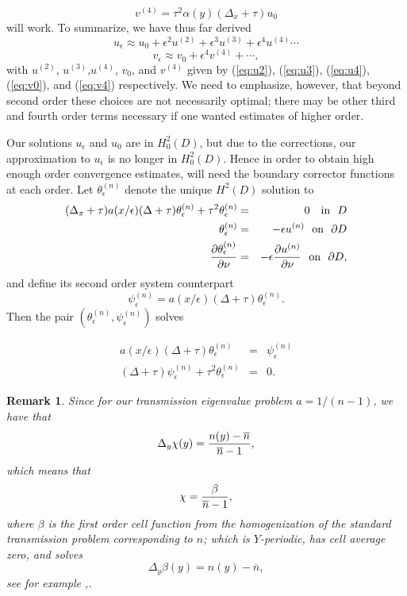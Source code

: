 \documentclass[10pt,a4paper]{amsart}
\newtheorem{remark}{Remark}
\begin{document}
\begin{equation}\label{eq:v4} v^{(4)} = \tau^2 \alpha(y) (\Delta_x +\tau) u_0  \end{equation}
will work. To summarize, we have thus far derived 
$$ u_\epsilon \approx u_0 +\epsilon^2 u^{(2)} +\epsilon^3 u^{(3)} +\epsilon^4 u^{(4)} \cdots $$
$$ v_\epsilon \approx v_0 + \epsilon^4 v^{(4)}+\cdots, $$
with $u^{(2)}$, $u^{(3)}$,$u^{(4)}$, $v_0$,  and $v^{(4)}$ given by (\ref{eq:u2}), (\ref{eq:u3}), (\ref{eq:u4}), (\ref{eq:v0}), and (\ref{eq:v4}) respectively. We need to emphasize, however, that beyond second order these choices are not necessarily optimal; there may be other third and fourth order terms necessary if one wanted estimates of higher order. 

\noindent
Our solutions $u_\epsilon$ and $u_0$ are in $H^2_0(D)$,  but due to the corrections, our approximation to $u_\epsilon$ is no longer in $H^2_0(D)$. Hence in order to obtain high enough order convergence estimates, will need the boundary corrector functions at each order. Let $\theta_\epsilon^{(n)}$ denote the unique $H^2(D)$ solution to 
\begin{eqnarray}   (\Delta_x +\tau) a(x/\epsilon) (\Delta +\tau) \theta_\epsilon^{(n)} +\tau^2\theta_\epsilon^{(n)} &=&  0 \ \ \ \mbox{in}\ \ D \label{thetaeps2} \\ 
\theta_\epsilon^{(n)} &=& -\epsilon u^{(n)} \ \ \mbox{on}\ \ \partial D \nonumber \\ {\partial  \theta_\epsilon^{(n)} \over{\partial\nu}}&=& -\epsilon {\partial u^{(n)}\over{\partial\nu}}  \ \ \mbox{on}\ \ \partial D,\nonumber\end{eqnarray}
and define its second order system counterpart 
\begin{equation}\label{eq:psieps} \psi_\epsilon^{(n)} = a(x/\epsilon) (\Delta +\tau) \theta_\epsilon^{(n)} .\end{equation}
Then the pair $(\theta^{(n)}_\epsilon, \psi^{(n)}_\epsilon)$ solves

\begin{eqnarray}\label{eq:uepssystem-ae2}  a(x/\epsilon) (\Delta +\tau )\theta^{(n)}_\epsilon  &=& \psi^{(n)}_\epsilon  \\ (\Delta +\tau )\psi^{(n)}_\epsilon  +\tau^2 \theta^{(n)}_\epsilon &=& 0. \nonumber\end{eqnarray}
\begin{remark} \label{rem} Since for our transmission eigenvalue problem $a= 1/(n-1)$, we have that 
\begin{equation}\label{betaeq2}  \Delta_y \chi(y) = {n(y) -\overline{n}\over{\overline{n}-1}} , \end{equation}
which means that $$\chi ={\beta \over{\overline{n}-1}},$$ where $\beta$ is the first order cell function from the homogenization of the standard transmission problem corresponding to $n$; which is $Y$-periodic, has cell average zero, and solves \begin{equation}\label{betaeq3}  \Delta_y \beta(y) = {n(y) -\overline{n}} , \end{equation}
see for example \cite{CaGuMoPa},\cite{CaMoPa}.
\end{remark} 
\end{document}
